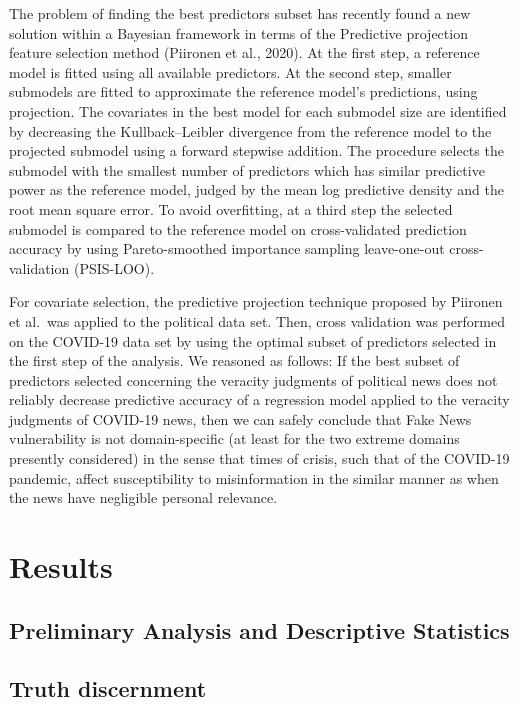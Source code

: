 \documentclass[
  english,
  man,floatsintext]{apa6}
\begin{document}
The problem of finding the best predictors subset has recently found a new solution within a Bayesian framework in terms of the Predictive projection feature selection method (Piironen et al., 2020). At the first step, a reference model is fitted using all available predictors. At the second step, smaller submodels are fitted to approximate the reference model's predictions, using projection. The covariates in the best model for each submodel size are identified by decreasing the Kullback--Leibler divergence from the reference model to the projected submodel using a forward stepwise addition. The procedure selects the submodel with the smallest number of predictors which has similar predictive power as the reference model, judged by the mean log predictive density and the root mean square error. To avoid overfitting, at a third step the selected submodel is compared to the reference model on cross-validated prediction accuracy by using Pareto-smoothed importance sampling leave-one-out cross-validation (PSIS-LOO).

For covariate selection, the predictive projection technique proposed by Piironen et al.~was applied to the political data set. Then, cross validation was performed on the COVID-19 data set by using the optimal subset of predictors selected in the first step of the analysis. We reasoned as follows: If the best subset of predictors selected concerning the veracity judgments of political news does not reliably decrease predictive accuracy of a regression model applied to the veracity judgments of COVID-19 news, then we can safely conclude that Fake News vulnerability is not domain-specific (at least for the two extreme domains presently considered) in the sense that times of crisis, such that of the COVID-19 pandemic, affect susceptibility to misinformation in the similar manner as when the news have negligible personal relevance.

\hypertarget{results}{%
\section{Results}\label{results}}

\hypertarget{preliminary-analysis-and-descriptive-statistics}{%
\subsection{Preliminary Analysis and Descriptive Statistics}\label{preliminary-analysis-and-descriptive-statistics}}

\hypertarget{truth-discernment}{%
\subsection{Truth discernment}\label{truth-discernment}}
\end{document}
